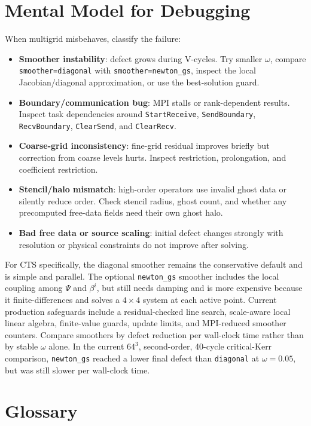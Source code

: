 \documentclass[11pt]{article}
\newcommand{\code}[1]{\texttt{#1}}
\begin{document}
\section{Mental Model for Debugging}

When multigrid misbehaves, classify the failure:
\begin{itemize}
  \item \textbf{Smoother instability}: defect grows during V-cycles.  Try smaller
        \(\omega\), compare \code{smoother=diagonal} with
        \code{smoother=newton\_gs}, inspect the local Jacobian/diagonal
        approximation, or use the best-solution guard.
  \item \textbf{Boundary/communication bug}: MPI stalls or rank-dependent results.
        Inspect task dependencies around \code{StartReceive}, \code{SendBoundary},
        \code{RecvBoundary}, \code{ClearSend}, and \code{ClearRecv}.
  \item \textbf{Coarse-grid inconsistency}: fine-grid residual improves briefly
        but correction from coarse levels hurts.  Inspect restriction,
        prolongation, and coefficient restriction.
  \item \textbf{Stencil/halo mismatch}: high-order operators use invalid ghost
        data or silently reduce order.  Check stencil radius, ghost count, and
        whether any precomputed free-data fields need their own ghost halo.
  \item \textbf{Bad free data or source scaling}: initial defect changes strongly
        with resolution or physical constraints do not improve after solving.
\end{itemize}

For CTS specifically, the diagonal smoother remains the conservative default and
is simple and parallel.  The optional \code{newton\_gs} smoother includes the
local coupling among \(\Psi\) and \(\beta^i\), but still needs damping and is
more expensive because it finite-differences and solves a \(4\times4\) system at
each active point.  Current production safeguards include a residual-checked
line search, scale-aware local linear algebra, finite-value guards, update
limits, and MPI-reduced smoother counters.  Compare smoothers by defect
reduction per wall-clock time rather than by stable \(\omega\) alone.  In the
current \(64^3\), second-order, 40-cycle critical-Kerr comparison,
\code{newton\_gs} reached a lower final defect than \code{diagonal} at
\(\omega=0.05\), but was still slower per wall-clock time.

\section{Glossary}
\end{document}
